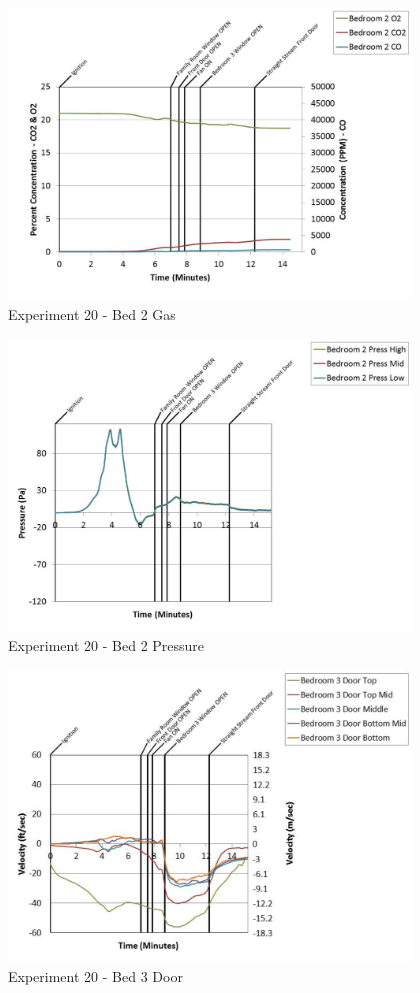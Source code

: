 \documentclass{article}
\begin{document}
\begin{appendices}
	\begin{figure}[h!]
		\centering
		\includegraphics[height=3.05in]{0_Images/Results_Charts/Exp_20_Charts/Bed2Gas.pdf}
		\caption{Experiment 20 - Bed 2 Gas}
	\end{figure}
 
	\clearpage

	\begin{figure}[h!]
		\centering
		\includegraphics[height=3.05in]{0_Images/Results_Charts/Exp_20_Charts/Bed2Pressure.pdf}
		\caption{Experiment 20 - Bed 2 Pressure}
	\end{figure}
 

	\begin{figure}[h!]
		\centering
		\includegraphics[height=3.05in]{0_Images/Results_Charts/Exp_20_Charts/Bed3Door.pdf}
		\caption{Experiment 20 - Bed 3 Door}
	\end{figure}
 

\end{appendices}
\end{document}
